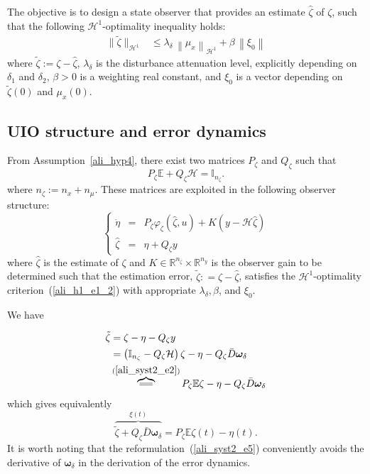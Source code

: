 \documentclass{ifacconf}
\def\eqref#1{(\ref{#1})}
\begin{document}
The objective is to design a state observer that provides an estimate $\hat{\zeta}$ of $\zeta$, such that the following $\mathcal{H}^1$-optimality inequality holds:
%
\begin{align}%
\| \tilde{\zeta} \|_{\mathcal{H}^{1}} &\leq \lambda_{\delta} \, \left\| \mu_{x} \right\|_{\mathcal{H}^{1}}  + \beta \, \left\| \xi_0 \right\| \label{ali_h1_e1_2}
\end{align}
where $\tilde{\zeta} := \zeta - \hat{\zeta}$, $\lambda_{\delta}$ is the disturbance attenuation level, explicitly depending on $\delta_1$ and $\delta_2$, $\beta > 0$ is a weighting real constant, and $\xi_0$ is a vector depending on $\tilde{\zeta}(0)$ and $\mu_{x}(0)$.%
\subsection{UIO structure and error dynamics}
From Assumption~\ref{ali_hyp4},  there exist two matrices $P_{\zeta}$ and $Q_{\zeta}$ such that
\begin{equation}\label{ali_syst2_e2}
 P_{\zeta} \mathbb{E} + Q_{\zeta} \mathcal{H} = \mathbb{I}_{n_{\zeta}}.
\end{equation}
where $n_{\zeta} := n_{x} + n_{\mu}$. These matrices are exploited in the following observer structure:
\begin{equation}\label{ali_syst2_e3}
\left\{
\begin{array}{rcl}
\dot{\eta} & = & P_{\zeta} \varphi_{\zeta}(\hat{\zeta},u) + K \left( y - \mathcal{H} \hat{\zeta} \right)
\\
\hat{\zeta} & = & \eta + Q_{\zeta} y 
\end{array}
\right.
\end{equation}
where $\hat{\zeta}$ is the estimate of $\zeta$ and $K \in\mathbb{R}^{n_{\zeta}}\times\mathbb{R}^{n_y}$ is the observer gain to be determined such that the estimation error, $\tilde{\zeta} : = \zeta - \hat{\zeta}$, satisfies the $\mathcal{H}^1$-optimality criterion~\eqref{ali_h1_e1_2} with appropriate $\lambda_{\delta}, \beta$, and $\xi_0$.
%

We have 

\begin{align}\label{ali_syst2_e4}
\tilde{\zeta} &= \zeta - \eta - Q_{\zeta} y \notag \\
&= \left(\mathbb{I}_{n_{\zeta}} - Q_{\zeta} \mathcal{H}\right) \zeta - \eta - Q_{\zeta} \bar{D} \bm{\omega}_{\delta} \notag \\
&\overbrace{ \mathrel{\scalebox{2}[1]{=}} }^{\eqref{ali_syst2_e2}} P_{\zeta} \mathbb{E} \zeta - \eta - Q_{\zeta} \bar{D} \bm{\omega}_{\delta}
\end{align}
which gives equivalently
\begin{equation}\label{ali_syst2_e5}
\overbrace{ \tilde{\zeta} + Q_{\zeta} \bar{D} \bm{\omega}_{\delta} }^{\xi(t)} = P_{\zeta} \mathbb{E} \zeta(t) - \eta(t).
\end{equation}
It is worth noting that the reformulation~\eqref{ali_syst2_e5} conveniently avoids the derivative of $\bm{\omega}_{\delta}$ in the derivation of the error dynamics.
\end{document}
